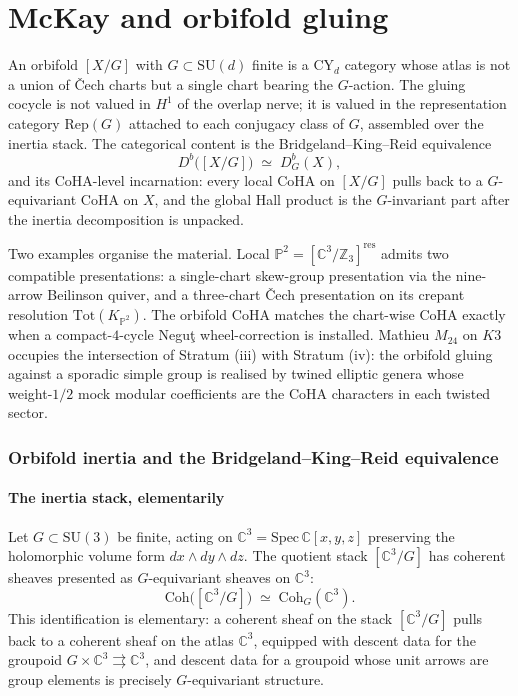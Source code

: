 
\part{McKay and orbifold gluing}
\label{part:gluing-mckay-orbifold}

An orbifold $[X/G]$ with $G \subset \mathrm{SU}(d)$ finite is a CY$_d$ category whose atlas is not a union of \v{C}ech charts but a single chart bearing the $G$-action. The gluing cocycle is not valued in $H^1$ of the overlap nerve; it is valued in the representation category $\mathrm{Rep}(G)$ attached to each conjugacy class of $G$, assembled over the inertia stack. The categorical content is the Bridgeland--King--Reid equivalence
\[
D^b\bigl([X/G]\bigr) \;\simeq\; D^b_G(X),
\]
and its CoHA-level incarnation: every local CoHA on $[X/G]$ pulls back to a $G$-equivariant CoHA on $X$, and the global Hall product is the $G$-invariant part after the inertia decomposition is unpacked.

Two examples organise the material. Local $\mathbb{P}^2 = [\mathbb{C}^3/\mathbb{Z}_3]^{\mathrm{res}}$ admits two compatible presentations: a single-chart skew-group presentation via the nine-arrow Beilinson quiver, and a three-chart \v{C}ech presentation on its crepant resolution $\mathrm{Tot}(K_{\mathbb{P}^2})$. The orbifold CoHA matches the chart-wise CoHA exactly when a compact-$4$-cycle Negu\c{t} wheel-correction is installed. Mathieu $M_{24}$ on $K3$ occupies the intersection of Stratum (iii) with Stratum (iv): the orbifold gluing against a sporadic simple group is realised by twined elliptic genera whose weight-$1/2$ mock modular coefficients are the CoHA characters in each twisted sector.

\section{Orbifold inertia and the Bridgeland--King--Reid equivalence}
\label{sec:orbifold-inertia-bkr}

\subsection{The inertia stack, elementarily}
\label{subsec:inertia-stack}

Let $G \subset \mathrm{SU}(3)$ be finite, acting on $\mathbb{C}^3 = \mathrm{Spec}\,\mathbb{C}[x,y,z]$ preserving the holomorphic volume form $dx \wedge dy \wedge dz$. The quotient stack $[\mathbb{C}^3/G]$ has coherent sheaves presented as $G$-equivariant sheaves on $\mathbb{C}^3$:
\[
\mathrm{Coh}\bigl([\mathbb{C}^3/G]\bigr) \;\simeq\; \mathrm{Coh}_G(\mathbb{C}^3).
\]
This identification is elementary: a coherent sheaf on the stack $[\mathbb{C}^3/G]$ pulls back to a coherent sheaf on the atlas $\mathbb{C}^3$, equipped with descent data for the groupoid $G \times \mathbb{C}^3 \rightrightarrows \mathbb{C}^3$, and descent data for a groupoid whose unit arrows are group elements is precisely $G$-equivariant structure.

